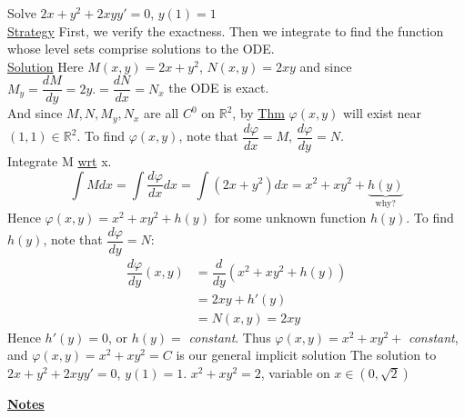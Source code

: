 \begin{example-N}
	Solve $2x + y^2 + 2xyy'=0$, $y(1) = 1$\\
	\underline{\large Strategy} First, we verify the exactness. Then we integrate to find the function whose level sets comprise solutions to the ODE.\\
	\underline{\large Solution} Here $M(x,y) = 2x + y^2$, $N(x,y) = 2xy$ and since $M_y = \dfrac{dM}{dy} = 2y. = \dfrac{dN}{dx} = N_x$ the ODE is exact.\\
	And since $M, N, M_y, N_x$ are all $C^0$ on $\mathbb{R}^2$, by \underline{Thm} $\varphi (x,y)$ will exist near $(1,1) \in \mathbb{R}^2$. To find $\varphi (x,y)$, note that $\dfrac{d \varphi}{dx} = M$, $\dfrac{d \varphi}{dy} = N$.\\
	Integrate M \underline{wrt} x.
	\begin{equation*}
		\int M dx = \int \dfrac{d \varphi}{dx} dx = \int (2x + y^2)dx = x^2 + xy^2 + \underbrace{h(y)}_{\text{why?}}
	\end{equation*}
	Hence $\varphi (x,y) = x^2 + xy^2 + h(y)$ for some unknown function $h(y)$. To find $h(y)$, note that $\dfrac{d \varphi}{dy} = N$:
	\begin{align*}
		\dfrac{d \varphi}{dy}(x,y) & = \dfrac{d}{dy}(x^2 + xy^2 + h(y))\\
		& = 2xy + h'(y)\\
		& = N(x,y) = 2xy
	\end{align*}
	Hence $h'(y) = 0$, or $h(y) = $ \textit{constant}. Thus $\varphi (x,y) = x^2 + xy^2 + $ \textit{constant}, and $\varphi (x,y) = x^2 + xy^2 = C$ is our general implicit solution 
	The solution to $2x + y^2 + 2xyy' = 0$, $y(1) = 1$. $x^2 + xy^2 = 2$, variable on $x \in (0, \sqrt{2})$
\end{example-N}
{\large \textbf{\underline{Notes}}}
